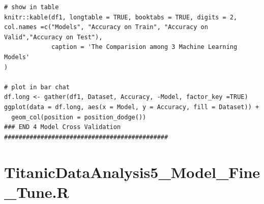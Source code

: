 \documentclass[
]{book}
\begin{document}
\begin{verbatim}
# show in table
knitr::kable(df1, longtable = TRUE, booktabs = TRUE, digits = 2, col.names =c("Models", "Accuracy on Train", "Accuracy on Valid","Accuracy on Test"),
             caption = 'The Comparision among 3 Machine Learning Models'
)

# plot in bar chat
df.long <- gather(df1, Dataset, Accuracy, -Model, factor_key =TRUE)
ggplot(data = df.long, aes(x = Model, y = Accuracy, fill = Dataset)) +
  geom_col(position = position_dodge())
### END 4 Model Cross Validation #############################################
\end{verbatim}

\hypertarget{titanicdataanalysis5_model_fine_tune.r}{%
\section*{TitanicDataAnalysis5\_Model\_Fine\_Tune.R}\label{titanicdataanalysis5_model_fine_tune.r}}
\end{document}
